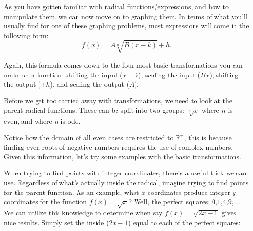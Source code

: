 \documentclass[lang=en,11pt]{elegantbook}
\begin{document}
As you have gotten familiar with radical functions/expressions, and how to manipulate them, we can now move on to graphing them. In terms of what you’ll usually find for one of these graphing problems, most expressions will come in the following form: $$f(x)=A\sqrt[n]{B(x-k)}+h.$$

Again, this formula comes down to the four most basic transformations you can make on a function: shifting the input ($x-k$), scaling the input ($Bx$), shifting the output ($+h$), and scaling the output ($A$).

Before we get too carried away with transformations, we need to look at the parent radical functions.  These can be split into two groups: $\sqrt[n]{x}$ where $n$ is even, and where $n$ is odd.

\begin{figure}[!h]
    \centering
     
\end{figure}

Notice how the domain of all even cases are restricted to $\mathbb{R}^+$, this is because finding even roots of negative numbers requires the use of complex numbers. Given this information, let’s try some examples with the basic transformations.

When trying to find points with integer coordinates, there’s a useful trick we can use. Regardless of what’s actually inside the radical, imagine trying to find points for the parent function. As an example, what $x$-coordinates produce integer $y$-coordinates for the function $f(x)=\sqrt{x}$? Well, the perfect squares: $0$,$1$,$4$,$9$,$\ldots$. We can utilize this knowledge to determine when say $f(x)=\sqrt{2x-1}$ gives nice results. Simply set the inside ($2x-1$) equal to each of the perfect squares:
\end{document}
